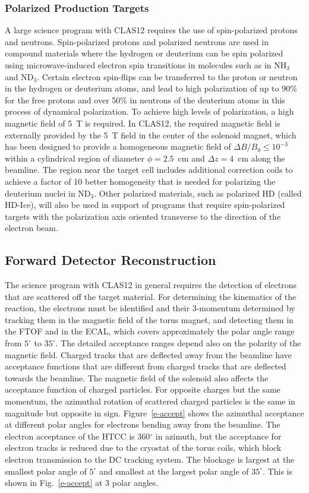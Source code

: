 \documentclass[final,3p,twocolumn]{elsarticle}
\begin{document}
\subsubsection{Polarized Production Targets} 

A large science program with CLAS12 requires the use of spin-polarized protons and neutrons. Spin-polarized
protons and polarized neutrons are used in compound materials where the hydrogen or deuterium can be spin
polarized using microwave-induced electron spin transitions in molecules such as in NH$_3$ and ND$_3$. Certain
electron spin-flips can be transferred to the proton or neutron in the hydrogen or deuterium atoms, and lead to high
polarization of up to 90\% for the free protons and over 50\% in neutrons of the deuterium atoms in this process
of dynamical polarization. To achieve high levels of polarization, a high magnetic field of 5~T is required. In CLAS12,
the required magnetic field is externally provided by the 5~T field in the center of the solenoid magnet, which has
been designed to provide a homogeneous magnetic field of $\Delta B / B_0 \leq 10^{-3}$ within a cylindrical region
of diameter $\phi = 2.5$~cm and $\Delta{z} = 4$~cm along the beamline.  The region near the target cell includes
additional correction coils to achieve a factor of 10 better homogeneity that is needed for polarizing the deuterium
nuclei in ND$_3$. Other polarized materials, such as polarized HD (called HD-Ice), will also be used in support of
programs that require spin-polarized targets with the polarization axis oriented transverse to the direction of the
electron beam.        

\subsection{Forward Detector Reconstruction} 

The science program with CLAS12 in general requires the detection of electrons that are scattered off the target
material. For determining the kinematics of the reaction, the electrons must be identified and their 3-momentum
determined by tracking them in the magnetic field of the torus magnet, and detecting them in the FTOF and in the
ECAL, which covers approximately the polar angle range from $5^\circ$ to $35^\circ$. The detailed acceptance
ranges depend also on the polarity of the magnetic field. Charged tracks that are deflected away from the beamline
have acceptance functions that are different from charged tracks that are deflected towards the beamline. The
magnetic field of the solenoid also affects the acceptance function of charged particles. For opposite charges but
the same momentum, the azimuthal rotation of scattered charged particles is the same in magnitude but opposite in
sign. Figure~\ref{e-accept} shows the azimuthal acceptance at different polar angles for electrons bending away
from the beamline. The electron acceptance of the HTCC is 360$^\circ$ in azimuth, but the acceptance for electron
tracks is reduced due to the cryostat of the torus coils, which block electron transmission to the DC tracking system.
The blockage is largest at the smallest polar angle of $5^\circ$ and smallest at the largest polar angle of $35^\circ$.
This is shown in Fig.~\ref{e-accept} at 3 polar angles.  
\end{document}
